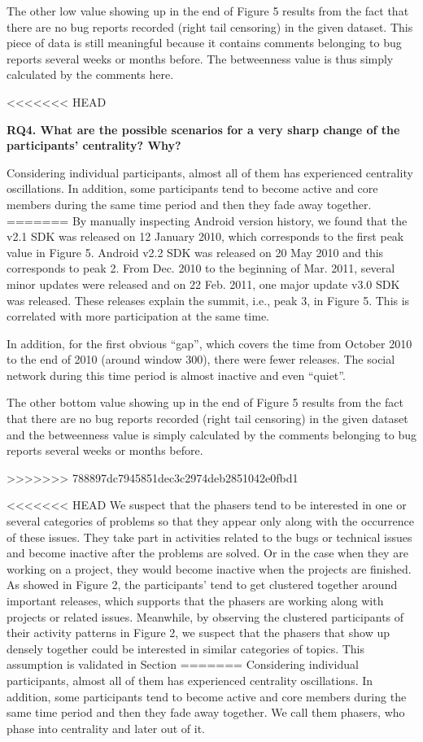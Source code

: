 \documentclass[conference]{IEEEtran}
\begin{document}
The other low value showing up in the end of Figure 5 results from
the fact that there are no bug reports recorded (right tail censoring) in the given dataset.
This piece of data is still meaningful because it contains comments belonging to bug reports several weeks or months before. The betweenness value is thus simply calculated by the comments here. 

<<<<<<< HEAD

\textbf{RQ4. What are the possible scenarios for a very sharp change of the participants' centrality? Why?}

Considering individual participants, almost all of them has
experienced centrality oscillations. In addition, some participants
tend to become active and core members during the same time
period and then they fade away together.
=======
By manually inspecting Android version history, we found that the v2.1
SDK was released on 12 January 2010, which corresponds to the first peak
value in Figure 5. Android v2.2 SDK was released on 20 May 2010 and this
corresponds to peak 2. From Dec. 2010 to the beginning of Mar. 2011,
several minor updates were released and on 22 Feb. 2011, one major
update v3.0 SDK was released. These releases explain the summit, i.e.,
peak 3, in  Figure 5. This is correlated with more participation at
the same time.

In addition, for the first obvious ``gap'', which covers the time from
October 2010 to the end of 2010 (around window 300), there were fewer
releases. The social network during this time period is almost inactive
and even ``quiet''.


The other bottom value showing up in the end of Figure 5 results from
the fact that there are no bug reports recorded (right tail censoring) in the given dataset
and the betweenness value is simply calculated by the comments
belonging to bug reports several weeks or months before. 

>>>>>>> 788897dc7945851dec3c2974deb2851042e0fbd1


<<<<<<< HEAD
We suspect that the phasers tend to be interested in one or several
categories of problems so that they appear only along with the
occurrence of these issues. They take part in activities related to
the bugs or technical issues and become inactive after the problems are
solved. Or in the case when they are working on a project, they would become inactive when the projects are finished. 
As showed in Figure 2, the participants' tend to get clustered together around important releases, which supports that the phasers are working along with projects or related issues.
Meanwhile, by observing the clustered participants of their
activity patterns in Figure 2, we suspect that the phasers that show
up densely together could be interested in similar categories of
topics. 
This assumption is validated in Section
=======
Considering individual participants, almost all of them has
experienced centrality oscillations. In addition, some participants
tend to become active and core members during the same time
period and then they fade away together. We call them phasers, who
phase into centrality and later out of it.
\end{document}
